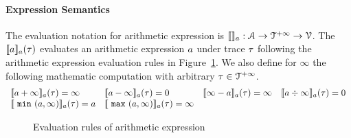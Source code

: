 \paragraph{Expression Semantics}
The evaluation notation for arithmetic expression is $\llbracket  \rrbracket_{a} : \mathcal{A} \to \mathcal{T}^{+\infty} \to \mathcal{V}$.
The $\llbracket a \rrbracket_{a}(\mathtt{\tau})$ evaluates an arithmetic expression $a$ under trace $\mathtt{\tau}$ following the arithmetic expression evaluation rules in Figure~\ref{fig:aexpr-eval}.
We also define for $\infty$ the following mathematic computation with arbitrary $\mathtt{\tau} \in \mathcal{T}^{+\infty}$.
 \[
  \begin{array}{llll}
  \llbracket a + \infty \rrbracket_{a} (\mathtt{\tau}) = \infty
 &
 \llbracket a - \infty \rrbracket_{a} (\mathtt{\tau}) = 0
 &
 \llbracket \infty - a \rrbracket_{a} (\mathtt{\tau}) = \infty
  &
 \llbracket a \div \infty \rrbracket_{a} (\mathtt{\tau}) = 0
 \\
 \llbracket ~\mathtt{min}~(a, \infty) \rrbracket_{a} (\mathtt{\tau}) = a
 &
 \llbracket ~\mathtt{max}~(a, \infty) \rrbracket_{a} (\mathtt{\tau}) = \infty
  \end{array}
 \]
\begin{figure}
   \caption{Evaluation rules of arithmetic expression}
   \label{fig:aexpr-eval}
   \end{figure}

